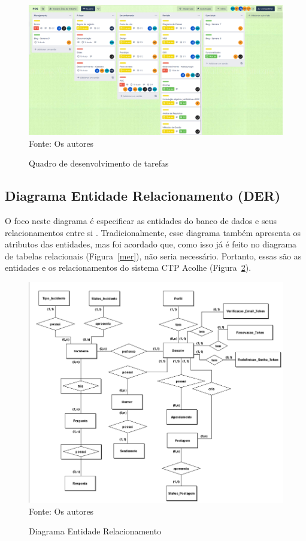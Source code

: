 \documentclass[12pt,a4paper]{article}
\begin{document}
\begin{figure}[H]
    \centering
    \caption{Quadro de desenvolvimento de tarefas}
     \includegraphics[width=15cm]{img7.png}
    Fonte: Os autores
    \label{l01}
\end{figure}

\newpage

\subsection{Diagrama Entidade Relacionamento (DER)}
O foco neste diagrama é especificar as entidades do banco de dados e seus relacionamentos entre si \cite{der}. Tradicionalmente, esse diagrama também apresenta os atributos das entidades, mas foi acordado que, como isso já é feito no diagrama de tabelas relacionais (Figura~\ref{mer}), não seria necessário. Portanto, essas são as entidades e os relacionamentos do sistema \gls{CTP Acolhe} (Figura~\ref{der}).

\begin{figure}[H]
    \centering
    \caption{Diagrama Entidade Relacionamento}
     \includegraphics[width=15cm]{der.png}
    Fonte: Os autores
    \label{der}
\end{figure}
\end{document}
